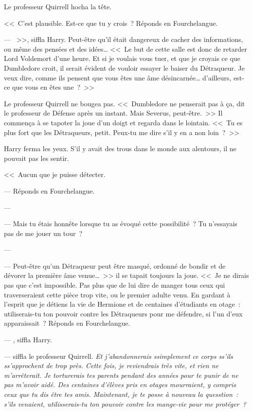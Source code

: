 Le professeur Quirrell hocha la tête.

<<~C'est plausible. Est-ce que tu y crois~? Réponds en Fourchelangue.

--- ~>>, siffla Harry. Peut-être qu'il était dangereux de cacher des informations, ou même des pensées et des idées… <<~Le but de cette salle est donc de retarder Lord Voldemort d'une heure. Et si je voulais vous tuer, et que je croyais ce que Dumbledore croit, il serait évident de vouloir essayer le baiser du Détraqueur. Je veux dire, comme ils pensent que vous êtes une âme désincarnée… d'ailleurs, est-ce que vous en êtes une~?~>>

Le professeur Quirrell ne bougea pas. <<~Dumbledore ne penserait pas à ça, dit le professeur de Défense après un instant. Mais Severus, peut-être.~>> Il commença à se tapoter la joue d'un doigt et regarda dans le lointain. <<~Tu es plus fort que les Détraqueurs, petit. Peux-tu me dire s'il y en a non loin~?~>>

Harry ferma les yeux. S'il y avait des trous dans le monde aux alentours, il ne pouvait pas les sentir.

<<~Aucun que je puisse détecter.

--- Réponds en Fourchelangue.

--- 

--- Mais tu étais honnête lorsque tu as évoqué cette possibilité~? Tu n'essayais pas de me jouer un tour~?

--- 

--- Peut-être qu'un Détraqueur peut être masqué, ordonné de bondir et de dévorer la première âme venue…~>> il se tapait toujours la joue. <<~Je ne dirais pas que c'est impossible. Pas plus que de lui dire de manger tous ceux qui traverseraient cette pièce trop vite, ou le premier adulte venu. En gardant à l'esprit que je détiens la vie de Hermione et de centaines d'étudiants en otage~: utiliserais-tu ton pouvoir contre les Détraqueurs pour me défendre, si l'un d'eux apparaissait~? Réponds en Fourchelangue.

--- , siffla Harry.

---  siffla le professeur Quirrell. \emph{Et j'abandonnerais ssimplement ce corps ss'ils ss'approchent de trop près. Cette fois, je reviendrais très vite, et rien ne m'arrêterait. Je torturerais tes parents pendant des années pour te punir de ne pas m'avoir aidé. Des centaines d'élèves pris en otages mourraient, y compris ceux que tu dis être tes amis. Maintenant, je te posse à nouveau la quesstion~: s'ils venaient, utilisserais-tu ton pouvoir contre les mange-vie pour me protéger~?}

